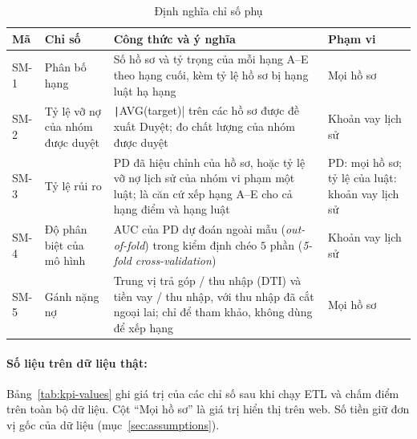 \begin{table}[H]
	\centering
	\caption{Định nghĩa chỉ số phụ}
	\label{tab:kpi-secondary}
	\footnotesize
	\begin{tabular}{l p{3.2cm} p{8.4cm} p{2.6cm}}
		\toprule
		\textbf{Mã} & \textbf{Chỉ số}                 & \textbf{Công thức và ý nghĩa}                                                                                                         & \textbf{Phạm vi}                                 \\
		\midrule
		SM-1        & Phân bố hạng                    & Số hồ sơ và tỷ trọng của mỗi hạng A--E theo hạng cuối, kèm tỷ lệ hồ sơ bị hạng luật hạ hạng                                           & Mọi hồ sơ                                        \\
		SM-2        & Tỷ lệ vỡ nợ của nhóm được duyệt & \texttt|AVG(target)| trên các hồ sơ được đề xuất Duyệt; đo chất lượng của nhóm được duyệt            & Khoản vay lịch sử                                \\
		SM-3        & Tỷ lệ rủi ro                    & PD đã hiệu chỉnh của hồ sơ, hoặc tỷ lệ vỡ nợ lịch sử của nhóm vi phạm một luật; là căn cứ xếp hạng A--E cho cả hạng điểm và hạng luật & PD: mọi hồ sơ; tỷ lệ của luật: khoản vay lịch sử \\
		SM-4        & Độ phân biệt của mô hình        & AUC của PD dự đoán ngoài mẫu (\textit{out-of-fold}) trong kiểm định chéo $5$ phần (\textit{5-fold cross-validation})                  & Khoản vay lịch sử                                \\
		SM-5        & Gánh nặng nợ                    & Trung vị trả góp / thu nhập (DTI) và tiền vay / thu nhập, với thu nhập đã cắt ngoại lai; chỉ để tham khảo, không dùng để xếp hạng     & Mọi hồ sơ                                        \\
		\bottomrule
	\end{tabular}
\end{table}

\paragraph{Số liệu trên dữ liệu thật:} Bảng~\ref{tab:kpi-values} ghi giá trị của các chỉ số sau khi chạy ETL và chấm điểm trên toàn bộ dữ liệu. Cột ``Mọi hồ sơ'' là giá trị hiển thị trên web. Số tiền giữ đơn vị gốc của dữ liệu (mục~\ref{sec:assumptions}).


